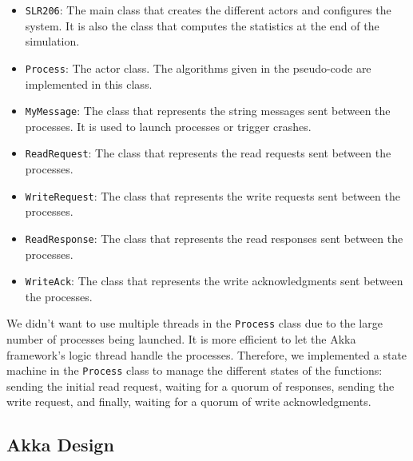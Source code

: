 \begin{itemize}
    \item \texttt{SLR206}: The main class that creates the different actors and configures the system. It is also the class that computes the statistics at the end of the simulation.

    \item \texttt{Process}: The actor class. The algorithms given in the pseudo-code are implemented in this class.

    \item \texttt{MyMessage}: The class that represents the string messages sent between the processes. It is used to launch processes or trigger crashes.

    \item \texttt{ReadRequest}: The class that represents the read requests sent between the processes.

    \item \texttt{WriteRequest}: The class that represents the write requests sent between the processes.

    \item \texttt{ReadResponse}: The class that represents the read responses sent between the processes.

    \item \texttt{WriteAck}: The class that represents the write acknowledgments sent between the processes.
    
\end{itemize}

We didn't want to use multiple threads in the \texttt{Process} class due to the large number of processes
being launched. It is more efficient to let the Akka framework's logic thread handle the processes.
Therefore, we implemented a state machine in the \texttt{Process} class to manage the different states
of the functions: sending the initial read request, waiting for a quorum of responses, sending the
write request, and finally, waiting for a quorum of write acknowledgments.


\newpage
\subsection{Akka Design}

